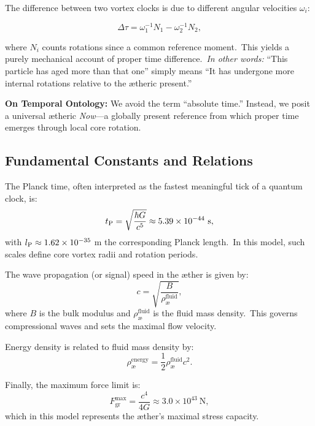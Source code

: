The difference between two vortex clocks is due to different angular velocities $\omega_i$:

\[
\Delta \tau = \omega_1^{-1} N_1 - \omega_2^{-1} N_2,
\]

where $N_i$ counts rotations since a common reference moment.\ This yields a purely mechanical account of proper time difference.\ \textit{In other words:} “This particle has aged more than that one” simply means “It has undergone more internal rotations relative to the ætheric present.”

\begin{remark}
\textbf{On Temporal Ontology:} We avoid the term “absolute time.” Instead, we posit a universal ætheric \emph{Now}—a globally present reference from which proper time emerges through local core rotation.
\end{remark}


\subsection*{Fundamental Constants and Relations}
The Planck time, often interpreted as the fastest meaningful tick of a quantum clock, is:
\[
    t_{\textrm P} = \sqrt{\frac{\hbar G}{c^5}} \approx 5.39\times10^{-44}\ \text{s},
\]
with $l_{\textrm P} \approx 1.62\times10^{-35}$ m the corresponding Planck length.\ In this model, such scales define core vortex radii and rotation periods.

The wave propagation (or signal) speed in the æther is given by:
\[
    c = \sqrt{\frac{B}{\rho^{\text{fluid}}_{\text{\ae}}}},
\]
where $B$ is the bulk modulus and $\rho^{\text{fluid}}_{\text{\ae}}$ is the fluid mass density.\ This governs compressional waves and sets the maximal flow velocity.

Energy density is related to fluid mass density by:
\[
    \rho^{\text{energy}}_{\text{\ae}} = \frac{1}{2} \rho^{\text{fluid}}_{\text{\ae}} c^2.
\]

Finally, the maximum force limit is:
\[
    F^{\text{max}}_{\text{gr}} = \frac{c^4}{4G} \approx 3.0 \times 10^{43}\ \text{N},
\]
which in this model represents the æther’s maximal stress capacity.
